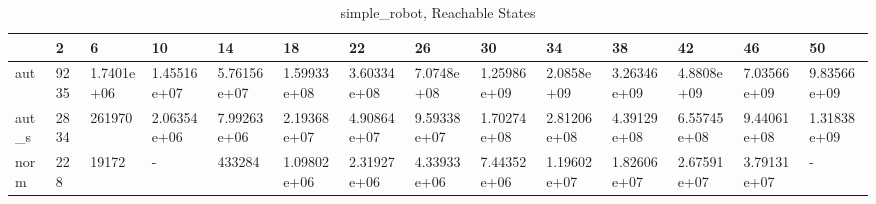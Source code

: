\begin{table}
\caption{simple_robot, Reachable States}
\label{simple_robot_reach}
\begin{tabular}{llllllllllllll}
\toprule
 & 2 & 6 & 10 & 14 & 18 & 22 & 26 & 30 & 34 & 38 & 42 & 46 & 50 \\
\midrule
aut & 9235 & 1.7401e+06 & 1.45516e+07 & 5.76156e+07 & 1.59933e+08 & 3.60334e+08 & 7.0748e+08 & 1.25986e+09 & 2.0858e+09 & 3.26346e+09 & 4.8808e+09 & 7.03566e+09 & 9.83566e+09 \\
aut_s & 2834 & 261970 & 2.06354e+06 & 7.99263e+06 & 2.19368e+07 & 4.90864e+07 & 9.59338e+07 & 1.70274e+08 & 2.81206e+08 & 4.39129e+08 & 6.55745e+08 & 9.44061e+08 & 1.31838e+09 \\
norm & 228 & 19172 & - & 433284 & 1.09802e+06 & 2.31927e+06 & 4.33933e+06 & 7.44352e+06 & 1.19602e+07 & 1.82606e+07 & 2.67591e+07 & 3.79131e+07 & - \\
\bottomrule
\end{tabular}
\end{table}
